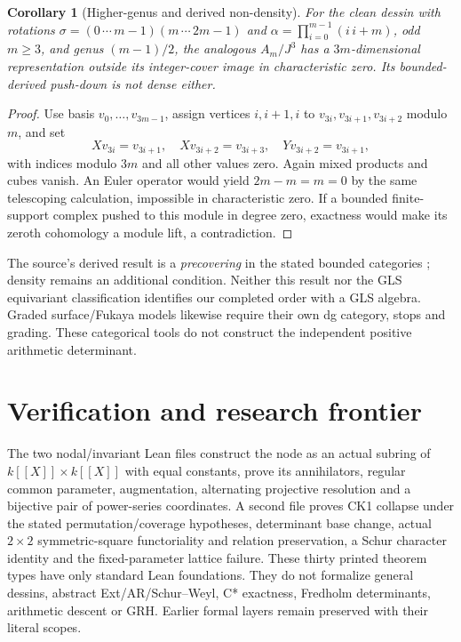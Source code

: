 \documentclass[11pt,oneside,openany]{book}
\newtheorem{corollary}[theorem]{Corollary}
\theoremstyle{definition}\newtheorem{definition}[theorem]{Definition}
\theoremstyle{remark}\newtheorem{remark}[theorem]{Remark}
\begin{document}
\begin{corollary}[Higher-genus and derived non-density]\label{cover:higher}
For the clean dessin with rotations
$\sigma=(0\,\cdots\,m-1)(m\,\cdots\,2m-1)$ and
$\alpha=\prod_{i=0}^{m-1}(i\,i+m)$, odd $m\geq3$, and genus $(m-1)/2$,
the analogous $A_m/J^3$ has a $3m$-dimensional representation
outside its integer-cover image in characteristic zero. Its bounded-derived
push-down is not dense either.
\end{corollary}
\begin{proof}
Use basis $v_0,\ldots,v_{3m-1}$, assign vertices $i,i+1,i$ to
$v_{3i},v_{3i+1},v_{3i+2}$ modulo $m$, and set
\[
 Xv_{3i}=v_{3i+1},\quad Xv_{3i+2}=v_{3i+3},\quad
 Yv_{3i+2}=v_{3i+1},
\]
with indices modulo $3m$ and all other values zero. Again mixed products
and cubes vanish. An Euler operator would yield $2m-m=m=0$ by the same
telescoping calculation, impossible in characteristic zero. If a bounded
finite-support complex pushed to this module in degree zero, exactness would
make its zeroth cohomology a module lift, a contradiction.
\end{proof}

The source's derived result is a \emph{precovering} in the stated bounded
categories \cite[Theorem~4.28]{CoveringLecture2026}; density remains an
additional condition. Neither this result nor the GLS equivariant
classification \cite{TameGLS2026} identifies our completed order with a GLS
algebra. Graded surface/Fukaya models \cite{SchrollGeometric2026} likewise
require their own dg category, stops and grading. These categorical tools
do not construct the independent positive arithmetic determinant.



\chapter{Verification and research frontier}
The two nodal/invariant Lean files construct the node as an actual subring of $k[[X]]\times k[[X]]$ with equal constants, prove its annihilators, regular common parameter, augmentation, alternating projective resolution and a bijective pair of power-series coordinates. A second file proves CK1 collapse under the stated permutation/coverage hypotheses, determinant base change, actual $2\times2$ symmetric-square functoriality and relation preservation, a Schur character identity and the fixed-parameter lattice failure. These thirty printed theorem types have only standard Lean foundations. They do not formalize general dessins, abstract Ext/AR/Schur--Weyl, C* exactness, Fredholm determinants, arithmetic descent or GRH. Earlier formal layers remain preserved with their literal scopes.
\end{document}
